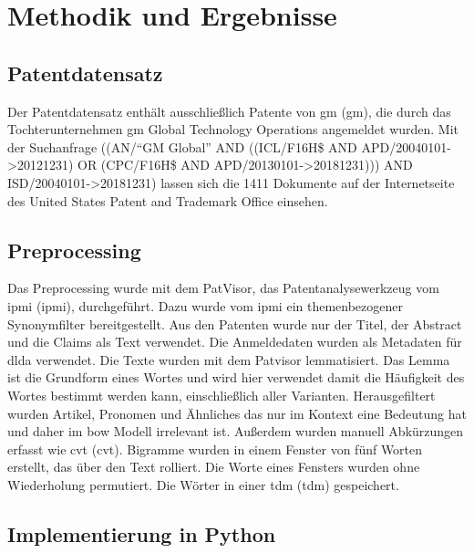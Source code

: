 \chapter{Methodik und Ergebnisse}

\section{Patentdatensatz}
Der Patentdatensatz enthält ausschließlich Patente von \acl{gm} (\ac{gm}), die durch das Tochterunternehmen \ac{gm} Global Technology Operations angemeldet wurden. Mit der Suchanfrage ((AN/\enquote{GM Global} AND ((ICL/F16H\$ AND APD/20040101->20121231) OR (CPC/F16H\$ AND APD/20130101->20181231))) AND ISD/20040101->20181231)  lassen sich die 1411 Dokumente auf der Internetseite des United States Patent and Trademark Office einsehen. 

\section{Preprocessing}
Das Preprocessing wurde mit dem PatVisor\textregistered, das Patentanalysewerkzeug vom \acl{ipmi} (\ac{ipmi}), durchgeführt. Dazu wurde vom \ac{ipmi} ein themenbezogener Synonymfilter bereitgestellt. Aus den Patenten wurde nur der Titel, der Abstract und die Claims als Text verwendet. Die Anmeldedaten wurden als Metadaten für \ac{dlda} verwendet. Die Texte wurden mit dem Patvisor lemmatisiert. Das Lemma ist die Grundform eines Wortes und wird hier verwendet damit die Häufigkeit des Wortes bestimmt werden kann, einschließlich aller Varianten. Herausgefiltert wurden Artikel, Pronomen und Ähnliches das nur im Kontext eine Bedeutung hat und daher im \acl{bow} Modell irrelevant ist. Außerdem wurden manuell Abkürzungen erfasst wie \acl{cvt} (\ac{cvt}). Bigramme wurden in einem Fenster von fünf Worten erstellt, das über den Text rolliert. Die Worte eines Fensters wurden ohne Wiederholung permutiert. Die Wörter in einer \acl{tdm} (\ac{tdm}) gespeichert.

\section{Implementierung in Python}


